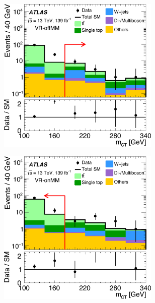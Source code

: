 \begin{figure}
	\begin{subfigure}[b]{0.5\linewidth}
		\centering\includegraphics[width=0.85\textwidth]{OneLeptonbb_VR_UnderFlowBin_VRtt2offnomct2EM_mct2_yellow}
	\end{subfigure}\hfill
	\begin{subfigure}[b]{0.5\linewidth}
		\centering\includegraphics[width=0.85\textwidth]{OneLeptonbb_VR_UnderFlowBin_VRtt2onnomct2EM_mct2_yellow}
	\end{subfigure}\hfill
	\par\medskip
	\begin{subfigure}[b]{0.5\linewidth}

\end{subfigure}
\end{figure}
